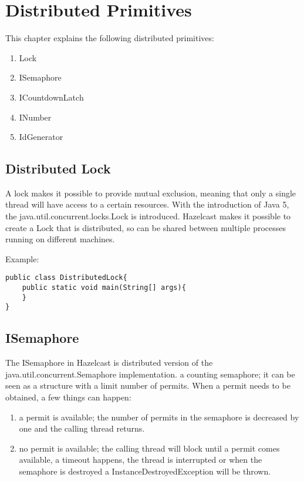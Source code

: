 \chapter{Distributed Primitives}

This chapter explains the following distributed primitives:
\begin{enumerate}
\item Lock
\item ISemaphore
\item ICountdownLatch
\item INumber
\item IdGenerator
\end{enumerate}

\section{Distributed Lock}

A lock makes it possible to provide mutual exclusion, meaning that only a single
thread will have access to a certain resources. With the introduction of Java 5,
the java.util.concurrent.locks.Lock is introduced. Hazelcast makes it possible
to create a Lock that is distributed, so can be shared between multiple processes
running on different machines.

Example:

\begin{verbatim}
public class DistributedLock{
    public static void main(String[] args){
    }
}
\end{verbatim}

\section{ISemaphore}

The ISemaphore in Hazelcast is distributed version of the java.util.concurrent.Semaphore
implementation. a counting semaphore; it can be seen as a structure with 
a limit number of permits. When a permit needs to be obtained, a few things can happen:
\begin{enumerate}
\item a permit is available; the number of permits in the semaphore is decreased by one 
and the calling thread returns.
\item no permit is available; the calling thread will block until a permit comes available,
a timeout happens, the thread is interrupted or when the semaphore is destroyed a InstanceDestroyedException
will be thrown.
\end{enumerate}

